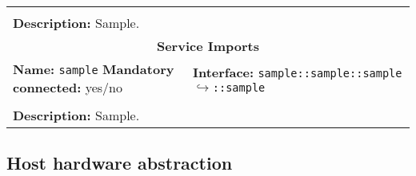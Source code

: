\begin{center}
\begin{tabular}{|p{7.5cm}|p{7.5cm}|}
		\multicolumn{2}{|l|}{}\\
		\multicolumn{2}{|p{15cm}|}{\textbf{Description:} \newline Sample.}\\
		\hline
		\hline
		\multicolumn{2}{|c|}{\textbf{\large Service Imports}}\\
		\hline
		\multicolumn{1}{|p{7.5cm}}{\textbf{Name:} \texttt{sample} \newline \textbf{Mandatory connected:} yes/no} & \multicolumn{1}{p{7.5cm}|}{\textbf{Interface:} \newline \texttt{sample::sample::sample} \newline$\hookrightarrow$\texttt{::sample}}\\
		\multicolumn{2}{|l|}{}\\
		\multicolumn{2}{|p{15cm}|}{\textbf{Description:} \newline Sample.}\\
		\hline
	\end{tabular}
\end{center}

\subsection{Host hardware abstraction}

